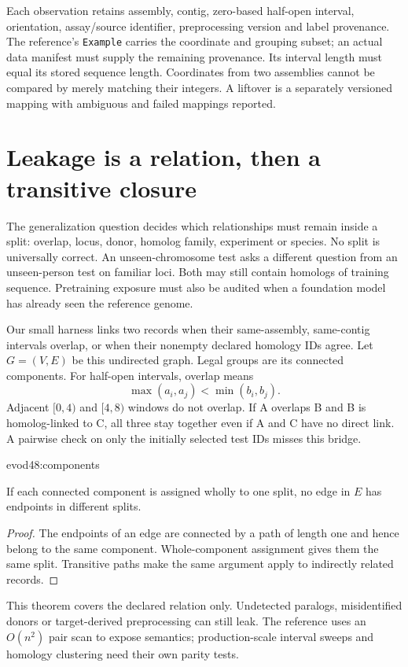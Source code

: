 Each observation retains assembly, contig, zero-based half-open interval,
orientation, assay/source identifier, preprocessing version and label provenance.
The reference's \texttt{Example} carries the coordinate and grouping subset;
an actual data manifest must supply the remaining provenance. Its interval length
must equal its stored sequence length. Coordinates from two assemblies cannot
be compared by merely matching their integers. A liftover is a separately
versioned mapping with ambiguous and failed mappings reported.

\section{Leakage is a relation, then a transitive closure}
The generalization question decides which relationships must remain inside a
split: overlap, locus, donor, homolog family, experiment or species. No split
is universally correct. An unseen-chromosome test asks a different question
from an unseen-person test on familiar loci. Both may still contain homologs
of training sequence. Pretraining exposure must also be audited when a
foundation model has already seen the reference genome.

Our small harness links two records when their same-assembly, same-contig
intervals overlap, or when their nonempty declared homology IDs agree.
Let $G=(V,E)$ be this undirected graph. Legal groups are its connected
components. For half-open intervals, overlap means
\[
\max(a_i,a_j)<\min(b_i,b_j).
\]
Adjacent $[0,4)$ and $[4,8)$ windows do not overlap. If A overlaps B and B
is homolog-linked to C, all three stay together even if A and C have no
direct link. A pairwise check on only the initially selected test IDs misses
this bridge.

{evod48:components}

\begin{proposition}
If each connected component is assigned wholly to one split, no edge in $E$
has endpoints in different splits.
\end{proposition}
\begin{proof}
The endpoints of an edge are connected by a path of length one and hence
belong to the same component. Whole-component assignment gives them the same
split. Transitive paths make the same argument apply to indirectly related
records.
\end{proof}
This theorem covers the declared relation only. Undetected paralogs,
misidentified donors or target-derived preprocessing can still leak. The
reference uses an $O(n^2)$ pair scan to expose semantics; production-scale
interval sweeps and homology clustering need their own parity tests.

